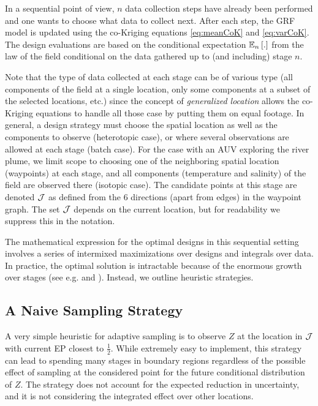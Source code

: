 \documentclass[aoas]{imsart}
\begin{document}
In a sequential point of view, $n$ data collection steps have already been performed and one wants to choose what data to collect next. After each step, the GRF model is updated using the co-Kriging equations \ref{eq:meanCoK} and \ref{eq:varCoK}. The design evaluations are based on the conditional expectation
$\mathbb{E}_{n} \left[.\right]$ from the law of the field conditional on the data gathered up to (and including) stage $n$. 

Note that the type of data collected at each stage can be of various type (all components of the field at a single location, only some components at a subset of the selected locations, etc.) since the concept of \textit{generalized location} allows the co-Kriging equations to handle all those case by putting them on equal footage.
In general, a design strategy must choose the spatial location as well as the components to observe (heterotopic case), or where several observations are allowed at each stage (batch case).
For the case with an AUV exploring the river plume, we limit scope to choosing one of the neighboring spatial location (waypoints) at each stage, and all components (temperature and salinity) of the field are observed there (isotopic case). The candidate points at this stage are denoted $\mathcal{J}$ as defined from the 6 directions (apart from edges) in the waypoint graph. The set $\mathcal{J}$ depends on the current location, but for readability we suppress this in the notation. 

The mathematical expression for the optimal designs in this sequential setting involves a series
of intermixed maximizations over designs and integrals over data. In
practice, the optimal solution is intractable because of the enormous
growth over stages (see e.g. \cite{sucar2015probabilistic} and
\cite{powell2016perspectives}).  Instead, we outline heuristic
strategies.



\subsection{A Naive Sampling Strategy}
\label{naive}

A very simple heuristic for adaptive sampling is to observe $Z$ at the location in $\mathcal{J}$ with current EP closest to $\frac{1}{2}$. While extremely easy to implement, this strategy can lead to spending many stages in boundary regions regardless of the possible effect of sampling at the considered point for the future conditional distribution of $Z$. The strategy does not account for the expected reduction in uncertainty, and it is not considering the integrated effect over other locations.  
\end{document}

